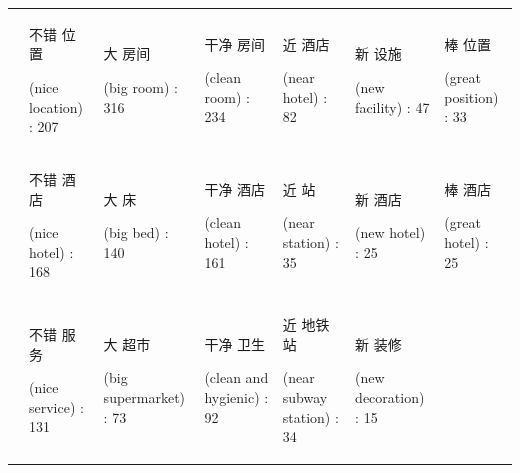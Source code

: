 \documentclass[smallextended,natbib]{svjour3}       %
\begin{document}
\begin{landscape}
\begin{table}[p]
{\begin{tabular}{|c|l|l|l|l|l|l|}
         &
          \begin{CJK}{UTF8}{gbsn}不错 位置\end{CJK} (nice location) : 207 &
          \begin{CJK}{UTF8}{gbsn}大 房间\end{CJK} (big room) : 316 &
          \begin{CJK}{UTF8}{gbsn}干净 房间\end{CJK} (clean room) : 234 &
          \begin{CJK}{UTF8}{gbsn}近 酒店\end{CJK} (near hotel) : 82 &
          \begin{CJK}{UTF8}{gbsn}新 设施\end{CJK} (new facility) : 47 &
          \begin{CJK}{UTF8}{gbsn}棒 位置\end{CJK} (great position) : 33 \\
         &
          \begin{CJK}{UTF8}{gbsn}不错 酒店\end{CJK} (nice hotel) : 168 &
          \begin{CJK}{UTF8}{gbsn}大 床\end{CJK} (big bed) : 140 &
          \begin{CJK}{UTF8}{gbsn}干净 酒店\end{CJK} (clean hotel) : 161 &
          \begin{CJK}{UTF8}{gbsn}近 站\end{CJK} (near station) : 35 &
          \begin{CJK}{UTF8}{gbsn}新 酒店\end{CJK} (new hotel) : 25 &
          \begin{CJK}{UTF8}{gbsn}棒 酒店\end{CJK} (great hotel) : 25 \\
         &
          \begin{CJK}{UTF8}{gbsn}不错 服务\end{CJK} (nice service) : 131 &
          \begin{CJK}{UTF8}{gbsn}大 超市\end{CJK} (big supermarket) : 73 &
          \begin{CJK}{UTF8}{gbsn}干净 卫生\end{CJK} (clean and hygienic) : 92 &
          \begin{CJK}{UTF8}{gbsn}近 地铁站\end{CJK} (near subway station) : 34 &
          \begin{CJK}{UTF8}{gbsn}新 装修\end{CJK} (new decoration) : 15 &

\end{tabular}}
\end{table}
\end{landscape}
\end{document}
